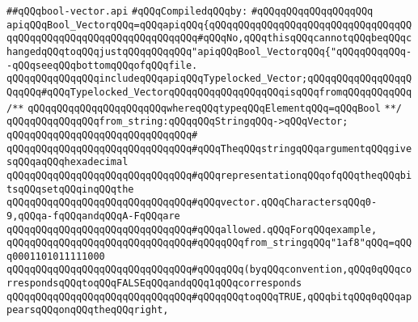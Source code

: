 \label{src/lib/src/bool-vector.api}
\verb|##qQQqbool-vector.api|\newline
\newline
\verb|#qQQqCompiledqQQqby:|\newline
\verb|#qQQqqQQqqQQqqQQqqQQq|\newline
\newline
\newline
\newline
\verb|apiqQQqBool_VectorqQQq=qQQqapiqQQq{qQQqqQQqqQQqqQQqqQQqqQQqqQQqqQQqqQQqqQQqqQQqqQQqqQQqqQQqqQQqqQQqqQQq#qQQqNo,qQQqthisqQQqcannotqQQqbeqQQqchangedqQQqtoqQQqjustqQQqqQQqqQQq"apiqQQqBool_VectorqQQq{"qQQqqQQqqQQq--qQQqseeqQQqbottomqQQqofqQQqfile.|\newline
\newline
\verb|qQQqqQQqqQQqqQQqincludeqQQqapiqQQqTypelocked_Vector;qQQqqQQqqQQqqQQqqQQqqQQq#qQQqTypelocked_VectorqQQqqQQqqQQqqQQqqQQqisqQQqfromqQQqqQQqqQQq|\newline
\verb|/**|\newline
\verb|qQQqqQQqqQQqqQQqqQQqqQQqwhereqQQqtypeqQQqElementqQQq=qQQqBool|\newline
\verb|**/|\newline
\newline
\verb|qQQqqQQqqQQqqQQqfrom_string:qQQqqQQqStringqQQq->qQQqVector;|\newline
\verb|qQQqqQQqqQQqqQQqqQQqqQQqqQQqqQQq#|\newline
\verb|qQQqqQQqqQQqqQQqqQQqqQQqqQQqqQQq#qQQqTheqQQqstringqQQqargumentqQQqgivesqQQqaqQQqhexadecimal|\newline
\verb|qQQqqQQqqQQqqQQqqQQqqQQqqQQqqQQq#qQQqrepresentationqQQqofqQQqtheqQQqbitsqQQqsetqQQqinqQQqthe|\newline
\verb|qQQqqQQqqQQqqQQqqQQqqQQqqQQqqQQq#qQQqvector.qQQqCharactersqQQq0-9,qQQqa-fqQQqandqQQqA-FqQQqare|\newline
\verb|qQQqqQQqqQQqqQQqqQQqqQQqqQQqqQQq#qQQqallowed.qQQqForqQQqexample,|\newline
\verb|qQQqqQQqqQQqqQQqqQQqqQQqqQQqqQQq#qQQqqQQqfrom_stringqQQq"1af8"qQQq=qQQq0001101011111000|\newline
\verb|qQQqqQQqqQQqqQQqqQQqqQQqqQQqqQQq#qQQqqQQq(byqQQqconvention,qQQq0qQQqcorrespondsqQQqtoqQQqFALSEqQQqandqQQq1qQQqcorresponds|\newline
\verb|qQQqqQQqqQQqqQQqqQQqqQQqqQQqqQQq#qQQqqQQqtoqQQqTRUE,qQQqbitqQQq0qQQqappearsqQQqonqQQqtheqQQqright,|\newline
